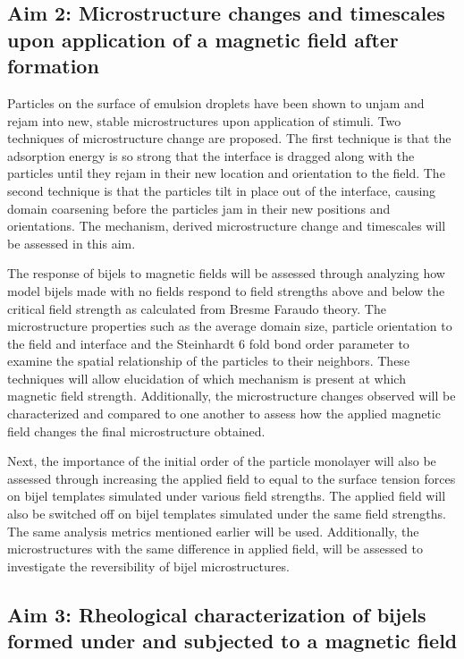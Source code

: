 \subsection{Aim 2: Microstructure changes and timescales upon application of a magnetic field after formation}
\label{section:aim2_desc}

Particles on the surface of emulsion droplets have been shown to unjam and rejam into new, stable microstructures upon application of 
stimuli. \cite{cui_stabilizing_2013} Two techniques of microstructure change are proposed. The first technique is that the adsorption 
energy is so strong that the interface is dragged along with the particles until they rejam in their new location and orientation to the 
field. The second technique is that the particles tilt in place out of the interface, causing domain coarsening before the particles jam 
in their new positions and orientations. The mechanism, derived microstructure change and timescales will be assessed in this aim.

The response of bijels to magnetic fields will be assessed through analyzing how model bijels made with no fields respond to field strengths 
above and below the critical field strength as calculated from Bresme Faraudo theory. The microstructure properties such as the average domain 
size, particle orientation to the field and interface and the Steinhardt 6 fold bond order parameter to examine the spatial relationship of 
the particles to their neighbors. These techniques will allow elucidation of which mechanism is present at which magnetic field strength. 
Additionally, the microstructure changes observed will be characterized and compared to one another to assess how the applied magnetic field 
changes the final microstructure obtained. 

Next, the importance of the initial order of the particle monolayer will also be assessed through increasing the applied field to equal to the 
surface tension forces on bijel templates simulated under various field strengths. The applied field will also be switched off on bijel templates 
simulated under the same field strengths. The same analysis metrics mentioned earlier will be used. Additionally, the microstructures with the 
same difference in applied field,  will be assessed to investigate the reversibility of bijel microstructures. 

\subsection{Aim 3: Rheological characterization of bijels formed under and subjected to a magnetic field}
\label{section:aim3_desc}

